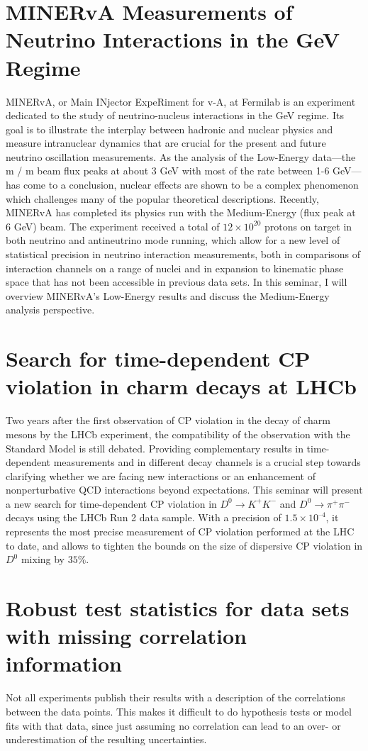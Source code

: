 \documentclass[12pt, a4paper, notitlepage, onecolumn]{article}
\begin{document}
\section{MINERvA Measurements of Neutrino Interactions in the GeV Regime}
\noindent MINERvA, or Main INjector ExpeRiment for v-A, at Fermilab is an experiment dedicated to the study of neutrino-nucleus interactions in the GeV regime. Its goal is to illustrate the interplay between hadronic and nuclear physics and measure intranuclear dynamics that are crucial for the present and future neutrino oscillation measurements. As the analysis of the Low-Energy data—the  m / m  beam flux peaks at about 3 GeV with most of the rate between 1-6 GeV—has come to a conclusion, nuclear effects are shown to be a complex phenomenon which challenges many of the popular theoretical descriptions. Recently, MINERvA has completed its physics run with the Medium-Energy (flux peak at 6 GeV) beam. The experiment received a total of $12\times 10^{20}$ protons on target in both neutrino and antineutrino mode running, which allow for a new level of statistical precision in neutrino interaction measurements, both in comparisons of interaction channels on a range of nuclei and in expansion to kinematic phase space that has not been accessible in previous data sets. In this seminar, I will overview MINERvA’s Low-Energy results and discuss the Medium-Energy analysis perspective.

\section{Search for time-dependent CP violation in charm decays at LHCb}
\noindent Two years after the first observation of CP violation in the decay of charm mesons by the LHCb experiment, the compatibility of the observation with the Standard Model is still debated. Providing complementary results in time-dependent measurements and in different decay channels is a crucial step towards clarifying whether we are facing new interactions or an enhancement of nonperturbative QCD interactions beyond expectations. This seminar will present a new search for time-dependent CP violation in $D^0\to K^+K^-$ and $D^0\to\pi^+\pi^-$ decays using the LHCb Run 2 data sample. With a precision of $1.5\times 10^{–4}$, it represents the most precise measurement of CP violation performed at the LHC to date, and allows to tighten the bounds on the size of dispersive CP violation in $D^0$ mixing by $35\%$.

\section{Robust test statistics for data sets with missing correlation information}
\noindent Not all experiments publish their results with a description of the correlations between the data points.  This makes it difficult to do hypothesis tests or model fits with that data, since just assuming no correlation can lead to an over- or underestimation of the resulting uncertainties.
\end{document}

